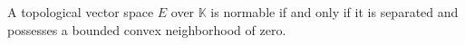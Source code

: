 A topological vector space $E$ over $\mathbb{K}$ is normable if and only if it is separated and possesses a bounded convex neighborhood of zero.